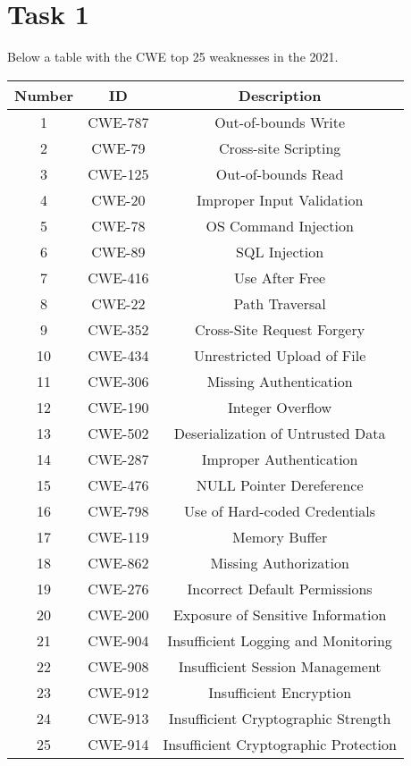 
\section{Task 1}
\label{lab4-task1}

Below a table with the CWE top 25 weaknesses in the 2021.
\begin{table}[H]
  \begin{center}
    \label{tab:lab4-table1}
    \begin{tabular}{c c c}
      \toprule
      \textbf{Number} & \textbf{ID} & \textbf{Description} \\
      \midrule
      1 & CWE-787 & Out-of-bounds Write\\
      2 & CWE-79 & Cross-site Scripting\\
      3 & CWE-125 & Out-of-bounds Read\\
      4 & CWE-20 & Improper Input Validation\\
      5 & CWE-78 & OS Command Injection\\
      6 & CWE-89 & SQL Injection\\
      7 & CWE-416 & Use After Free\\
      8 & CWE-22 & Path Traversal\\
      9 & CWE-352 & Cross-Site Request Forgery\\
      10 & CWE-434 & Unrestricted Upload of File\\
      11 & CWE-306 & Missing Authentication\\
      12 & CWE-190 & Integer Overflow\\
      13 & CWE-502 & Deserialization of Untrusted Data\\
      14 & CWE-287 & Improper Authentication\\
      15 & CWE-476 & NULL Pointer Dereference\\
      16 & CWE-798 & Use of Hard-coded Credentials\\
      17 & CWE-119 & Memory Buffer\\
      18 & CWE-862 & Missing Authorization\\
      19 & CWE-276 & Incorrect Default Permissions\\
      20 & CWE-200 & Exposure of Sensitive Information\\
      21 & CWE-904 & Insufficient Logging and Monitoring\\
      22 & CWE-908 & Insufficient Session Management\\
      23 & CWE-912 & Insufficient Encryption\\
      24 & CWE-913 & Insufficient Cryptographic Strength\\
      25 & CWE-914 & Insufficient Cryptographic Protection\\
      \bottomrule
    \end{tabular}
  \end{center}
\end{table}

